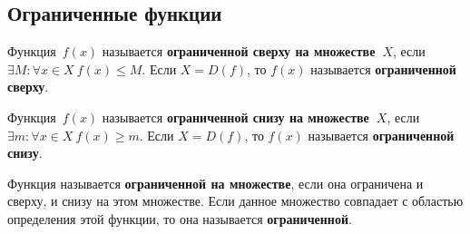 \subsection{Ограниченные функции}
 Функция~$f(x)$ называется \textbf{ограниченной сверху на множестве~$X$}, если $\exists M \colon \forall x \in X \ f(x) \leqslant M$.
Если $X = D(f)$, то $f(x)$ называется \textbf{ограниченной сверху}.

Функция~$f(x)$ называется \textbf{ограниченной снизу на множестве~$X$}, если $\exists m \colon \forall x \in X \ f(x) \geqslant m$.
Если $X = D(f)$, то $f(x)$ называется \textbf{ограниченной снизу}.

Функция называется \textbf{ограниченной на множестве}, если она ограничена и сверху, и снизу на этом множестве.
Если данное множество совпадает с областью определения этой функции, то она называется \textbf{ограниченной}.